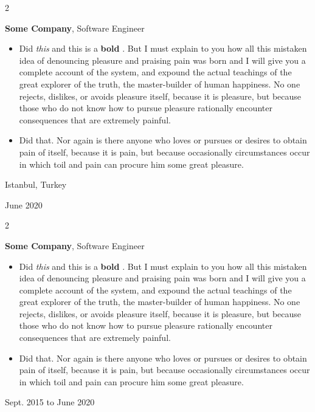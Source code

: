 \documentclass[10pt, letterpaper]{article}
\newenvironment{highlights}{
    \begin{itemize}[
        topsep=0.10 cm,
        parsep=0.10 cm,
        partopsep=0pt,
        itemsep=0pt,
        leftmargin=0.4 cm + 10pt
    ]
}{
    \end{itemize}
} %
\newenvironment{twocolentry}[2][]{
    \onecolentry
    \def\secondColumn{#2}
    \setcolumnwidth{\fill, 4.5 cm}
    \begin{paracol}{2}
}{
    \switchcolumn \raggedleft \secondColumn
    \end{paracol}
    \endonecolentry
} %
\let\hrefWithoutArrow\href
\renewcommand{\href}[2]{\hrefWithoutArrow{#1}{\mbox{\ifthenelse{\equal{#2}{}}{ }{#2 }\raisebox{.15ex}{\footnotesize \faExternalLink*}}}}
\begin{document}
        \vspace{0.2 cm}

        \begin{twocolentry}{
            Istanbul, Turkey

        June 2020
        }
            \textbf{Some \textnormal{Company}}, Software Engineer
            \begin{highlights}
                \item Did \textit{this} and this is a \textbf{bold} \href{https://example.com}{link}. But I must explain to you how all this mistaken idea of denouncing pleasure and praising pain was born and I will give you a complete account of the system, and expound the actual teachings of the great explorer of the truth, the master-builder of human happiness. No one rejects, dislikes, or avoids pleasure itself, because it is pleasure, but because those who do not know how to pursue pleasure rationally encounter consequences that are extremely painful.
                \item Did that. Nor again is there anyone who loves or pursues or desires to obtain pain of itself, because it is pain, but because occasionally circumstances occur in which toil and pain can procure him some great pleasure.
            \end{highlights}
        \end{twocolentry}


        \vspace{0.2 cm}

        \begin{twocolentry}{
            Sept. 2015 to June 2020
        }
            \textbf{Some \textnormal{Company}}, Software Engineer
            \begin{highlights}
                \item Did \textit{this} and this is a \textbf{bold} \href{https://example.com}{link}. But I must explain to you how all this mistaken idea of denouncing pleasure and praising pain was born and I will give you a complete account of the system, and expound the actual teachings of the great explorer of the truth, the master-builder of human happiness. No one rejects, dislikes, or avoids pleasure itself, because it is pleasure, but because those who do not know how to pursue pleasure rationally encounter consequences that are extremely painful.
                \item Did that. Nor again is there anyone who loves or pursues or desires to obtain pain of itself, because it is pain, but because occasionally circumstances occur in which toil and pain can procure him some great pleasure.
            \end{highlights}
        \end{twocolentry}
\end{document}
